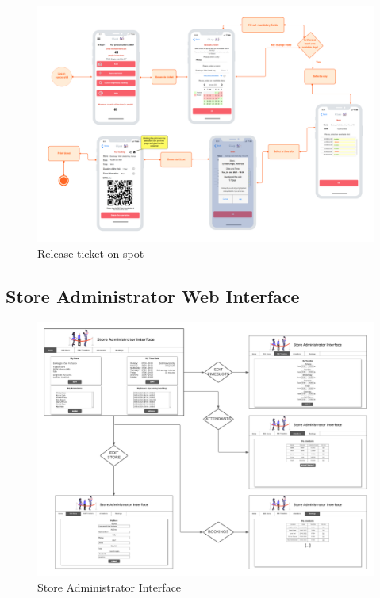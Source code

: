 \documentclass[table, 12pt]{article}
\begin{document}
\begin{center}
    \begin{figure}[H]
        \includegraphics[width=\textwidth]{assets/User-Interface-Design/generate_ticket_attendant.png}
        \caption{Release ticket on spot}
    \end{figure}
\end{center}

\subsection{Store Administrator Web Interface}
\begin{center}
    \begin{figure}[H]
        \includegraphics[width=\textwidth]{assets/Mockups/MockUpStoreAdmin.png}
        \caption{Store Administrator Interface}
    \end{figure}
\end{center}
\end{document}
